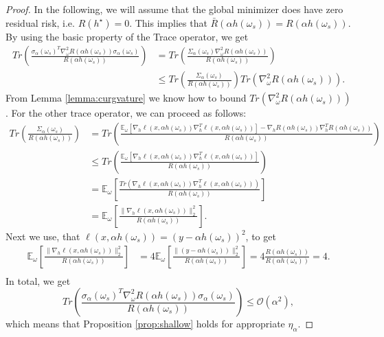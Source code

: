 \documentclass[10pt]{article} %
\newcommand{\bE}{\mathbb{E}}
\newcommand{\cO}{\mathcal{O}}
\begin{document}
    \begin{proof}
   In the following, we will assume that the global minimizer does have zero residual risk, i.e. $R(h^\star)=0$. This implies that $\bar{R}(\alpha h(\omega_s))=R(\alpha h(\omega_s))$. By using the basic property of the Trace operator, we get 
        \begin{align*}
            Tr\left(\frac{\sigma_\alpha(\omega_s)^T\nabla_\omega^2R(\alpha h(\omega_s))\sigma_\alpha(\omega_s)}{R(\alpha h(\omega_s))}\right)&=Tr\left(\frac{\Sigma_\alpha(\omega_s)\nabla_\omega^2R(\alpha h(\omega_s))}{R(\alpha h(\omega_s))}\right)\\
            &\leq Tr\left(\frac{\Sigma_\alpha(\omega_s)}{R(\alpha h(\omega_s))}\right)Tr(\nabla_\omega^2R(\alpha h(\omega_s))).
        \end{align*}
        From Lemma \ref{lemma:curgvature} we know how to bound $Tr(\nabla_\omega^2R(\alpha h(\omega_s)))$. For the other trace operator, we can proceed as follows:
        \begin{align*}
            Tr\left(\frac{\Sigma_\alpha(\omega_s)}{R(\alpha h(\omega_s))}\right)&=Tr\left(\frac{\bE_\omega[\nabla_h\ell(x,\alpha h(\omega_s))\nabla_h^T\ell(x,\alpha h(\omega_s))]-\nabla_h R(\alpha h(\omega_s))\nabla_h^TR(\alpha h(\omega_s))}{R(\alpha h(\omega_s))}\right)\\
            &\leq Tr\left(\frac{\bE_\omega[\nabla_h\ell(x,\alpha h(\omega_s))\nabla_h^T\ell(x,\alpha h(\omega_s))]}{R(\alpha h(\omega_s))}\right)\\
            &=\bE_\omega\left[\frac{Tr(\nabla_h\ell(x,\alpha h(\omega_s))\nabla_h^T\ell(x,\alpha h(\omega_s)))}{R(\alpha h(\omega_s))}\right]\\
            &=\bE_\omega\left[\frac{\|\nabla_h\ell(x,\alpha h(\omega_s))\|_2^2}{R(\alpha h(\omega_s))}\right].
        \end{align*}
        Next we use, that $\ell(x,\alpha h(\omega_s))=(y-\alpha h(\omega_s))^2$, to get
        \begin{align*}
            \bE_\omega\left[\frac{\|\nabla_h\ell(x,\alpha h(\omega_s))\|_2^2}{R(\alpha h(\omega_s))}\right]&=4\bE_\omega\left[\frac{\|(y-\alpha h(\omega_s))\|_2^2}{R(\alpha h(\omega_s))}\right]=4\frac{R(\alpha h(\omega_s))}{R(\alpha h(\omega_s))} = 4.\\
        \end{align*}
        In total, we get 
        $$ Tr\left(\frac{\sigma_\alpha(\omega_s)^T\nabla_\omega^2R(\alpha h(\omega_s))\sigma_\alpha(\omega_s)}{R(\alpha h(\omega_s))}\right)\leq \cO(\alpha^2),$$
        which means that Proposition \ref{prop:shallow} holds for appropriate $\eta_\alpha$.
    \end{proof}
\end{document}
